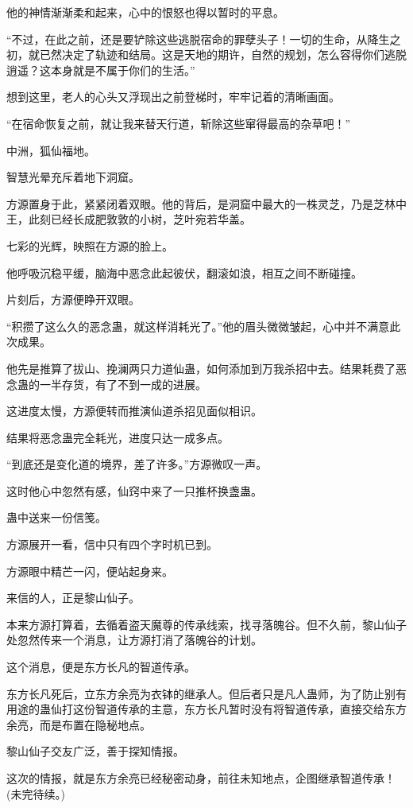 \begin{this_body}
他的神情渐渐柔和起来，心中的恨怒也得以暂时的平息。

“不过，在此之前，还是要铲除这些逃脱宿命的罪孽头子！一切的生命，从降生之初，就已然决定了轨迹和结局。这是天地的期许，自然的规划，怎么容得你们逃脱逍遥？这本身就是不属于你们的生活。”

想到这里，老人的心头又浮现出之前登梯时，牢牢记着的清晰画面。

“在宿命恢复之前，就让我来替天行道，斩除这些窜得最高的杂草吧！”

中洲，狐仙福地。

智慧光晕充斥着地下洞窟。

方源置身于此，紧紧闭着双眼。他的背后，是洞窟中最大的一株灵芝，乃是芝林中王，此刻已经长成肥敦敦的小树，芝叶宛若华盖。

七彩的光辉，映照在方源的脸上。

他呼吸沉稳平缓，脑海中恶念此起彼伏，翻滚如浪，相互之间不断碰撞。

片刻后，方源便睁开双眼。

“积攒了这么久的恶念蛊，就这样消耗光了。”他的眉头微微皱起，心中并不满意此次成果。

他先是推算了拔山、挽澜两只力道仙蛊，如何添加到万我杀招中去。结果耗费了恶念蛊的一半存货，有了不到一成的进展。

这进度太慢，方源便转而推演仙道杀招见面似相识。

结果将恶念蛊完全耗光，进度只达一成多点。

“到底还是变化道的境界，差了许多。”方源微叹一声。

这时他心中忽然有感，仙窍中来了一只推杯换盏蛊。

蛊中送来一份信笺。

方源展开一看，信中只有四个字时机已到。

方源眼中精芒一闪，便站起身来。

来信的人，正是黎山仙子。

本来方源打算着，去循着盗天魔尊的传承线索，找寻落魄谷。但不久前，黎山仙子处忽然传来一个消息，让方源打消了落魄谷的计划。

这个消息，便是东方长凡的智道传承。

东方长凡死后，立东方余亮为衣钵的继承人。但后者只是凡人蛊师，为了防止别有用途的蛊仙打这份智道传承的主意，东方长凡暂时没有将智道传承，直接交给东方余亮，而是布置在隐秘地点。

黎山仙子交友广泛，善于探知情报。

这次的情报，就是东方余亮已经秘密动身，前往未知地点，企图继承智道传承！(未完待续。)

\end{this_body}

